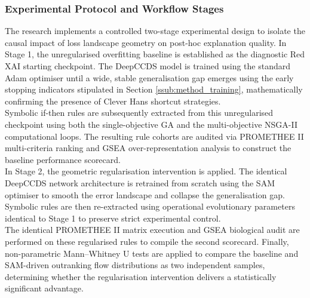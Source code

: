 \subsubsection{Experimental Protocol and Workflow Stages}
\label{ssub:method_experimental_protocol}
The research implements a controlled two-stage experimental design to isolate the 
causal impact of loss landscape geometry on post-hoc explanation quality. In Stage 1, 
the unregularised overfitting baseline is established as the diagnostic Red XAI 
starting checkpoint. The DeepCCDS model is trained using the standard Adam optimiser 
until a wide, stable generalisation gap emerges using the early stopping indicators 
stipulated in Section \ref{ssub:method_training}, mathematically confirming the 
presence of Clever Hans shortcut strategies. 
\\
Symbolic if-then rules are subsequently extracted from this unregularised checkpoint 
using both the single-objective GA and the multi-objective NSGA-II computational loops. 
The resulting rule cohorts are audited via PROMETHEE II multi-criteria ranking and 
GSEA over-representation analysis to construct the baseline performance scorecard.
\\
In Stage 2, the geometric regularisation intervention is applied. The identical 
DeepCCDS network architecture is retrained from scratch using the SAM optimiser to 
smooth the error landscape and collapse the generalisation gap. Symbolic rules are then 
re-extracted using operational evolutionary parameters identical to Stage 1 to preserve 
strict experimental control. 
\\
The identical PROMETHEE II matrix execution and GSEA biological audit are performed on 
these regularised rules to compile the second scorecard. Finally, non-parametric 
Mann--Whitney U tests are applied to compare the baseline and SAM-driven outranking flow 
distributions as two independent samples, determining whether the regularisation 
intervention delivers a statistically significant advantage.
\\
